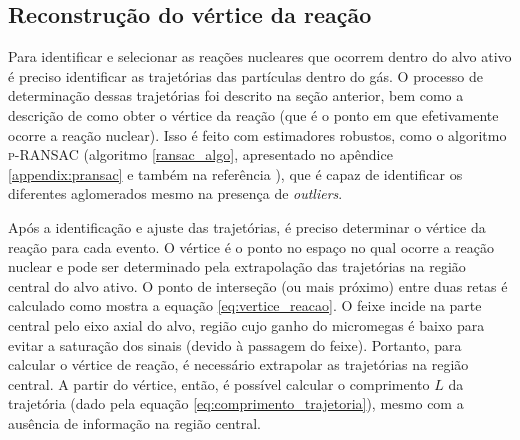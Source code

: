 \documentclass[a4paper,12pt,oneside]{book}
\begin{document}
\subsection{Reconstrução do vértice da reação}
\par Para identificar e selecionar as reações nucleares que ocorrem dentro do alvo ativo é preciso identificar as trajetórias das partículas dentro do gás. O processo de determinação dessas trajetórias foi descrito na seção anterior, bem como a descrição de como obter o vértice da reação (que é o ponto em que efetivamente ocorre a reação nuclear). Isso é feito com estimadores robustos, como o algoritmo \textsc{p-RANSAC} (algoritmo \ref{ransac_algo}, apresentado no apêndice \ref{appendix:pransac} e também na referência \cite{artigo}), que é capaz de identificar os diferentes aglomerados mesmo na presença de \textit{outliers}.

\par Após a identificação e ajuste das trajetórias, é preciso determinar o vértice da reação para cada evento. O vértice é o ponto no espaço no qual ocorre a reação nuclear e pode ser determinado pela extrapolação das trajetórias na região central do alvo ativo. O ponto de interseção (ou mais próximo) entre duas retas é calculado como mostra a equação \ref{eq:vertice_reacao}. O feixe incide na parte central pelo eixo axial do alvo, região cujo ganho do micromegas é baixo para evitar a saturação dos sinais (devido à passagem do feixe). Portanto, para calcular o vértice de reação, é necessário extrapolar as trajetórias na região central. A partir do vértice, então, é possível calcular o comprimento $L$ da trajetória (dado pela equação \ref{eq:comprimento_trajetoria}), mesmo com a ausência de informação na região central.
\end{document}
